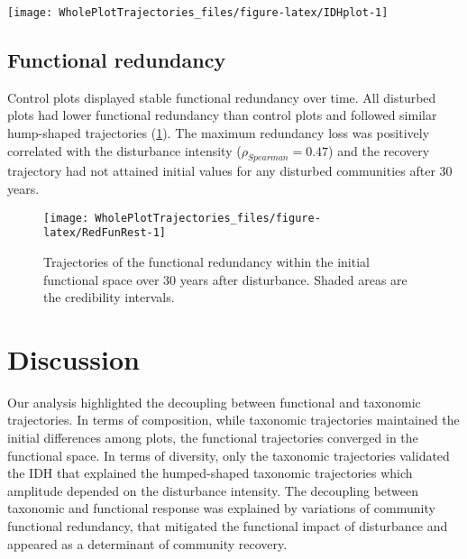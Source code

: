 \documentclass[fleqn,10pt]{ArtEcoFoG} %
\begin{document}
\begin{figure*}

{\centering \texttt{[image: WholePlotTrajectories\_files/figure-latex/IDHplot-1]} 

}

\caption{Relationship between the initial \%AGB loss and community taxonomic richness \textbf{(a)}, taxonomic evenness \textbf{(b)}, functional richness \textbf{(c)},and functional evenness \textbf{(d)} at 10, 20 and 30 years after disturbance}\label{fig:IDHplot}
\end{figure*}

\subsection{Functional redundancy}\label{functional-redundancy}

Control plots displayed stable functional redundancy over time. All
disturbed plots had lower functional redundancy than control plots and
followed similar hump-shaped trajectories (\ref{fig:RedFunRest}). The
maximum redundancy loss was positively correlated with the disturbance
intensity (\(\rho_{Spearman}=0.47\)) and the recovery trajectory had not
attained initial values for any disturbed communities after 30 years.

\begin{figure}

{\centering \texttt{[image: WholePlotTrajectories\_files/figure-latex/RedFunRest-1]} 

}

\caption{Trajectories of the functional redundancy within the initial functional space over 30 years after disturbance. Shaded areas are the credibility intervals.}\label{fig:RedFunRest}
\end{figure}

\section{Discussion}\label{discussion}

Our analysis highlighted the decoupling between functional and taxonomic
trajectories. In terms of composition, while taxonomic trajectories
maintained the initial differences among plots, the functional
trajectories converged in the functional space. In terms of diversity,
only the taxonomic trajectories validated the IDH that explained the
humped-shaped taxonomic trajectories which amplitude depended on the
disturbance intensity. The decoupling between taxonomic and functional
response was explained by variations of community functional redundancy,
that mitigated the functional impact of disturbance and appeared as a
determinant of community recovery.
\end{document}
